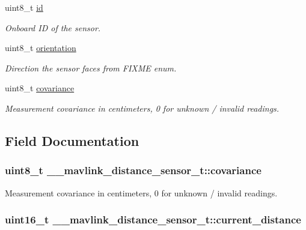 \begin{DoxyCompactItemize}
uint8\+\_\+t \hyperlink{struct____mavlink__distance__sensor__t_aa1571c2fd20e829474f6e2f29cd9c753}{id}
\begin{DoxyCompactList}\small\item\em Onboard I\+D of the sensor. \end{DoxyCompactList}\item 
uint8\+\_\+t \hyperlink{struct____mavlink__distance__sensor__t_af074a52389ea13cb4e410a59b1867303}{orientation}
\begin{DoxyCompactList}\small\item\em Direction the sensor faces from F\+I\+X\+M\+E enum. \end{DoxyCompactList}\item 
uint8\+\_\+t \hyperlink{struct____mavlink__distance__sensor__t_a860430e9a01d70a549c90038cc956b50}{covariance}
\begin{DoxyCompactList}\small\item\em Measurement covariance in centimeters, 0 for unknown / invalid readings. \end{DoxyCompactList}\end{DoxyCompactItemize}


\subsection{Field Documentation}
\hypertarget{struct____mavlink__distance__sensor__t_a860430e9a01d70a549c90038cc956b50}{
\subsubsection[{covariance}]{\setlength{\rightskip}{0pt plus 5cm}uint8\+\_\+t \+\_\+\+\_\+mavlink\+\_\+distance\+\_\+sensor\+\_\+t\+::covariance}}\label{struct____mavlink__distance__sensor__t_a860430e9a01d70a549c90038cc956b50}


Measurement covariance in centimeters, 0 for unknown / invalid readings. 

\hypertarget{struct____mavlink__distance__sensor__t_a62933c0663982034023b0e66dcf84cce}{
\subsubsection[{current\+\_\+distance}]{\setlength{\rightskip}{0pt plus 5cm}uint16\+\_\+t \+\_\+\+\_\+mavlink\+\_\+distance\+\_\+sensor\+\_\+t\+::current\+\_\+distance}}\label{struct____mavlink__distance__sensor__t_a62933c0663982034023b0e66dcf84cce}


